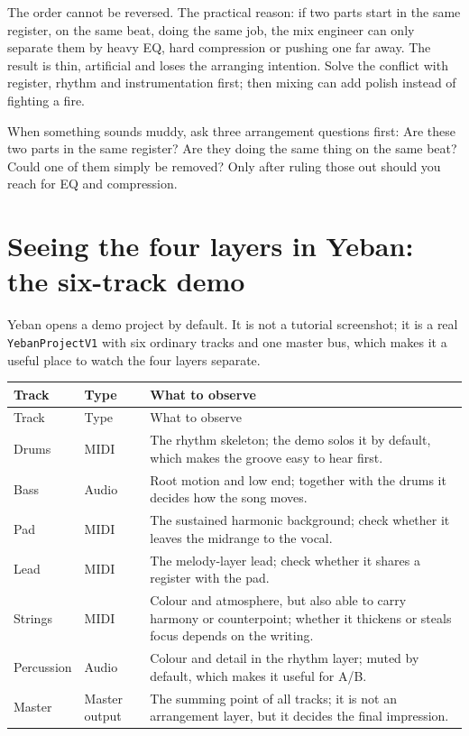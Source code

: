 The order cannot be reversed. The practical reason: if two parts start in the same register, on the same beat, doing the same job, the mix engineer can only separate them by heavy EQ, hard compression or pushing one far away. The result is thin, artificial and loses the arranging intention. Solve the conflict with register, rhythm and instrumentation first; then mixing can add polish instead of fighting a fire.

\begin{warnbox}
When something sounds muddy, ask three arrangement questions first: Are these two parts in the same register? Are they doing the same thing on the same beat? Could one of them simply be removed? Only after ruling those out should you reach for EQ and compression.
\end{warnbox}

\section{Seeing the four layers in Yeban: the six-track demo}
\label{sec:yeban-demo}

Yeban opens a demo project by default. It is not a tutorial screenshot; it is a real \texttt{YebanProjectV1} with six ordinary tracks and one master bus, which makes it a useful place to watch the four layers separate.

\begin{longtable}{p{}p{}p{}}
\toprule
Track & Type & What to observe \\
\midrule
\endfirsthead
\toprule
Track & Type & What to observe \\
\midrule
\endhead
Drums & MIDI & The rhythm skeleton; the demo solos it by default, which makes the groove easy to hear first. \\
Bass & Audio & Root motion and low end; together with the drums it decides how the song moves. \\
Pad & MIDI & The sustained harmonic background; check whether it leaves the midrange to the vocal. \\
Lead & MIDI & The melody-layer lead; check whether it shares a register with the pad. \\
Strings & MIDI & Colour and atmosphere, but also able to carry harmony or counterpoint; whether it thickens or steals focus depends on the writing. \\
Percussion & Audio & Colour and detail in the rhythm layer; muted by default, which makes it useful for A/B. \\
Master & Master output & The summing point of all tracks; it is not an arrangement layer, but it decides the final impression. \\
\bottomrule
\end{longtable}

